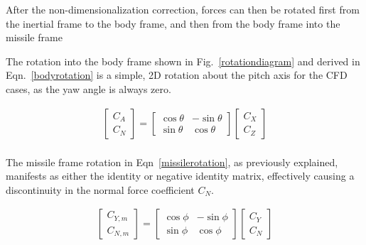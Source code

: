 \documentclass[]{aiaa-tc}%
\begin{document}
After the non-dimensionalization correction, forces can then be rotated first from the inertial frame to the body frame, and then from the body frame into the missile frame

The rotation into the body frame shown in Fig.~\ref{rotationdiagram} and derived in Eqn.~\ref{bodyrotation} is a simple, 2D rotation about the pitch axis for the CFD cases, as the yaw angle is always zero.

\begin{equation} \label{bodyrotation}
\begin{split}
  \begin{bmatrix}
  {C_A} \\
  {C_N}
  \end{bmatrix}
  =
  \begin{bmatrix}
  {\cos\theta} & {-\sin\theta} \\
  {\sin\theta} & { \cos\theta}
  \end{bmatrix}
  \begin{bmatrix}
  {C_X} \\
  {C_Z}
  \end{bmatrix} \\
\end{split}
\end{equation}

\noindent The missile frame rotation in Eqn~\ref{missilerotation}, as previously explained, manifests as either the identity or negative identity matrix, effectively causing a discontinuity in the normal force coefficient $C_N$.

\begin{equation} \label{missilerotation}
\begin{split}
  \begin{bmatrix}
  {C_{Y,m}} \\
  {C_{N,m}}
  \end{bmatrix}
  =
  \begin{bmatrix}
  {\cos\phi} & {-\sin\phi} \\
  {\sin\phi} & { \cos\phi}
  \end{bmatrix}
  \begin{bmatrix}
  {C_Y} \\
  {C_N}
  \end{bmatrix}
\end{split}
\end{equation}


% 
\end{document}
